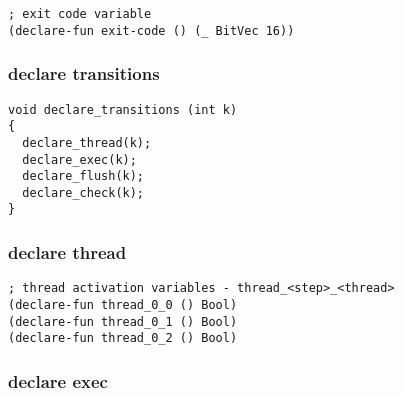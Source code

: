 \begin{lstlisting}[language=SMTLib]
; exit code variable
(declare-fun exit-code () (_ BitVec 16))
\end{lstlisting}

\subsubsection{declare transitions}


\begin{algorithm}[H]
\end{algorithm}

\begin{lstlisting}[style=c++]
void declare_transitions (int k)
{
  declare_thread(k);
  declare_exec(k);
  declare_flush(k);
  declare_check(k);
}
\end{lstlisting}

\subsubsection{declare thread}

\begin{algorithm}[H]
\end{algorithm}

\begin{algorithm}[H]
\end{algorithm}

\begin{lstlisting}[language=SMTLib]
; thread activation variables - thread_<step>_<thread>
(declare-fun thread_0_0 () Bool)
(declare-fun thread_0_1 () Bool)
(declare-fun thread_0_2 () Bool)
\end{lstlisting}

\subsubsection{declare exec}

